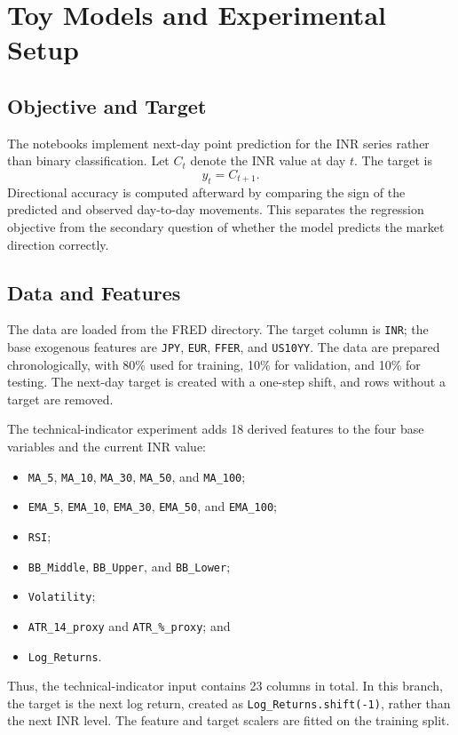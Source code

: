 \section{Toy Models and Experimental Setup}

\subsection{Objective and Target}

The notebooks implement next-day point prediction for the INR series rather than binary classification. Let $C_t$ denote the INR value at day $t$. The target is
\[
    y_t = C_{t+1}.
\]
Directional accuracy is computed afterward by comparing the sign of the predicted and observed day-to-day movements. This separates the regression objective from the secondary question of whether the model predicts the market direction correctly.

\subsection{Data and Features}

The data are loaded from the FRED directory. The target column is \texttt{INR}; the base exogenous features are \texttt{JPY}, \texttt{EUR}, \texttt{FFER}, and \texttt{US10YY}. The data are prepared chronologically, with 80\% used for training, 10\% for validation, and 10\% for testing. The next-day target is created with a one-step shift, and rows without a target are removed.

The technical-indicator experiment adds 18 derived features to the four base variables and the current INR value:
\begin{itemize}[leftmargin=1.5cm]
	\item \texttt{MA\_5}, \texttt{MA\_10}, \texttt{MA\_30}, \texttt{MA\_50}, and \texttt{MA\_100};
	\item \texttt{EMA\_5}, \texttt{EMA\_10}, \texttt{EMA\_30}, \texttt{EMA\_50}, and \texttt{EMA\_100};
	\item \texttt{RSI};
	\item \texttt{BB\_Middle}, \texttt{BB\_Upper}, and \texttt{BB\_Lower};
	\item \texttt{Volatility};
	\item \texttt{ATR\_14\_proxy} and \texttt{ATR\_\%\_proxy}; and
	\item \texttt{Log\_Returns}.
\end{itemize}
Thus, the technical-indicator input contains 23 columns in total. In this branch, the target is the next log return, created as \texttt{Log\_Returns.shift(-1)}, rather than the next INR level. The feature and target scalers are fitted on the training split.


